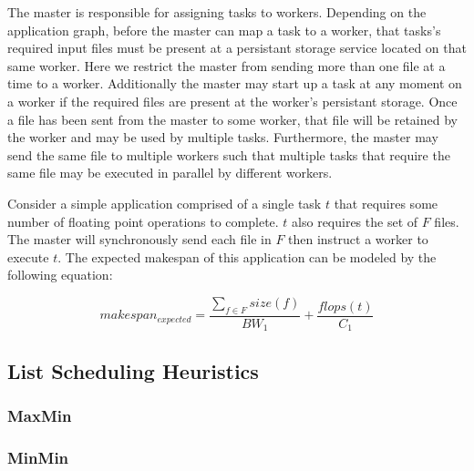 The master is responsible for assigning tasks to workers. Depending
on the application graph, before the master can map a task to a worker,
that tasks's required input files must be present at a persistant storage
service located on that same worker. Here we restrict the master from
sending more than one file at a time to a worker. Additionally the master
may start up a task at any moment on a worker if the required files are present
at the worker's persistant storage. Once a file has been sent from the master
to some worker, that file will be retained by the worker and may be used by
multiple tasks. Furthermore, the master may send the same file to multiple
workers such that multiple tasks that require the same file may be executed
in parallel by different workers.

Consider a simple application comprised of a single task $t$ that requires
some number of floating point operations to complete. $t$ also requires the set
of $F$ files. The master will synchronously send each file in $F$ then instruct
a worker to execute $t$. The expected makespan of this application can be
modeled by the following equation:

$$ makespan_{expected} = \frac{\sum\limits_{f \in F}size(f)}{BW_1} + \frac{flops(t)} {C_1} $$



\subsection{List Scheduling Heuristics} \subsubsection{MaxMin}
\subsubsection{MinMin}
